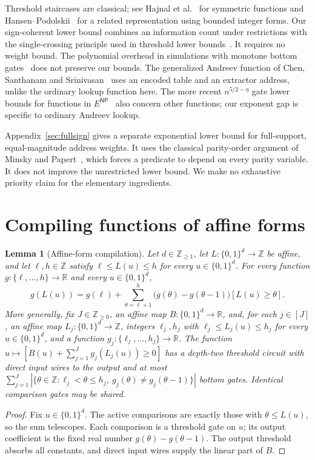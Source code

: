 \documentclass[11pt]{article}
\newtheorem{lemma}[theorem]{Lemma}
\newcommand{\bits}{\{0,1\}}
\begin{document}
Threshold staircases are classical; see Hajnal et al.~\cite[Proposition~2.1]{HMPST}
for symmetric functions and Hansen--Podolskii~\cite[Theorem~5]{HP} for a
related representation using bounded integer forms. Our sign-coherent
lower bound combines an information count under restrictions with the
single-crossing principle used in threshold lower bounds~\cite{IPS}.
It requires no weight bound. The polynomial overhead in simulations
with monotone bottom gates~\cite[Lemma~6]{HP} does not preserve our bounds.
The generalized Andreev function of Chen, Santhanam and
Srinivasan~\cite[Section~2.4]{CSS} uses an encoded table and an extractor
address, unlike the ordinary lookup function here. The more recent
$n^{5/2-\eta}$ gate lower bounds for functions in
$E^{\mathsf{NP}}$~\cite{CTW} also concern other functions; our exponent
gap is specific to ordinary Andreev lookup.

Appendix~\ref{sec:fullsign} gives a separate exponential lower bound
for full-support, equal-magnitude address weights. It uses the classical
parity-order argument of Minsky and Papert~\cite[Section~3.1]{MP}, which
forces a predicate to depend on every parity variable. It does not
improve the unrestricted lower bound. We make no exhaustive priority
claim for the elementary ingredients.

\section{Compiling functions of affine forms}\label{sec:identities}
\begin{lemma}[Affine-form compilation]\label{lem:ladder}
Let $d\in\mathbb Z_{\ge1}$, let $L:\bits^d\to\mathbb Z$ be affine,
and let $\ell,h\in\mathbb Z$ satisfy $\ell\le L(u)\le h$ for every
$u\in\bits^d$. For every function $g:\{\ell,\ldots,h\}\to\mathbb R$
and every $u\in\bits^d$,
$$
g(L(u))=g(\ell)+\sum_{\theta=\ell+1}^{h}
\bigl(g(\theta)-g(\theta-1)\bigr)[L(u)\ge\theta].
$$
More generally, fix $J\in\mathbb Z_{\ge0}$, an affine map
$B:\bits^d\to\mathbb R$, and, for each $j\in[J]$, an affine map $L_j:\bits^d\to\mathbb Z$,
integers $\ell_j,h_j$ with $\ell_j\le L_j(u)\le h_j$ for every $u\in\bits^d$,
and a function $g_j:\{\ell_j,\ldots,h_j\}\to\mathbb R$.
The function
$u\mapsto[B(u)+\sum_{j=1}^J g_j(L_j(u))\ge0]$
has a depth-two threshold circuit with direct input wires to the output
and at most
$\sum_{j=1}^J|\{\theta\in\mathbb Z:\ell_j<\theta\le h_j,\
g_j(\theta)\ne g_j(\theta-1)\}|$ bottom gates.
Identical comparison gates may be shared.
\end{lemma}
\begin{proof}
Fix $u\in\bits^d$. The active comparisons are exactly those with
$\theta\le L(u)$, so the sum telescopes.
Each comparison is a threshold gate on $u$; its output coefficient is
the fixed real number $g(\theta)-g(\theta-1)$.
The output threshold absorbs all constants, and direct input wires
supply the linear part of $B$.
\end{proof}
\end{document}
